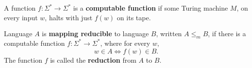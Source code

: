 \documentclass[12pt]{article}
\begin{document}
\begin{definition}
  A function  $f : \Sigma^*  \longrightarrow \Sigma^*$ is  a \textbf{computable
  function} if  some Turing machine  $M$, on every  input $w$, halts  with just
  $f(w)$ on its tape.
\end{definition}

\begin{definition}
  Language $A$ is \textbf{mapping reducible}  to language $B$, written $A \le_m
  B$,  if  there  is  a  computable  function  $f  :  \Sigma^*  \longrightarrow
  \Sigma^*$, where for every $w$, $$w \in A \iff f(w) \in B.$$ The function $f$
  is called the \textbf{reduction} from $A$ to $B$.
\end{definition}
\end{document}
